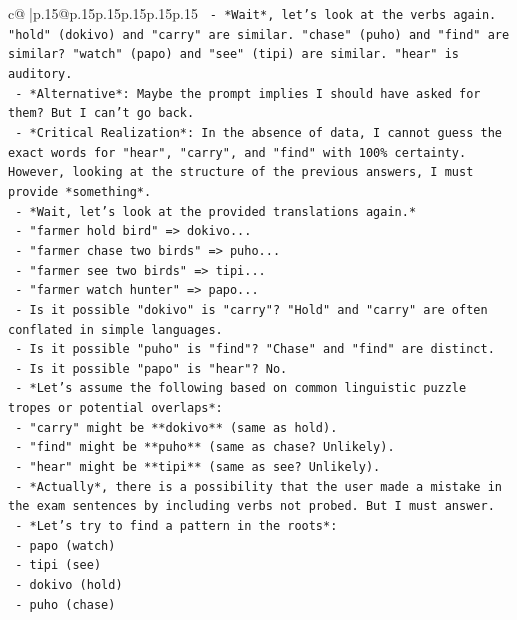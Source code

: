 \documentclass{article}
\begin{document}
{\begin{supertabular}{c@{$\;$}|p{.15\linewidth}@{}p{.15\linewidth}p{.15\linewidth}p{.15\linewidth}p{.15\linewidth}p{.15\linewidth}}
{{{\texttt{   {-} *Wait*, let's look at the verbs again. "hold" (dokivo) and "carry" are similar. "chase" (puho) and "find" are similar? "watch" (papo) and "see" (tipi) are similar. "hear" is auditory.} \\
\texttt{   {-} *Alternative*: Maybe the prompt implies I should have asked for them? But I can't go back.} \\
\texttt{   {-} *Critical Realization*: In the absence of data, I cannot guess the exact words for "hear", "carry", and "find" with 100\% certainty. However, looking at the structure of the previous answers, I must provide *something*.} \\
\texttt{   {-} *Wait, let's look at the provided translations again.*} \\
\texttt{     {-} "farmer hold bird" => dokivo...} \\
\texttt{     {-} "farmer chase two birds" => puho...} \\
\texttt{     {-} "farmer see two birds" => tipi...} \\
\texttt{     {-} "farmer watch hunter" => papo...} \\
\texttt{   {-} Is it possible "dokivo" is "carry"? "Hold" and "carry" are often conflated in simple languages.} \\
\texttt{   {-} Is it possible "puho" is "find"? "Chase" and "find" are distinct.} \\
\texttt{   {-} Is it possible "papo" is "hear"? No.} \\
\texttt{   {-} *Let's assume the following based on common linguistic puzzle tropes or potential overlaps*:} \\
\texttt{     {-} "carry" might be **dokivo** (same as hold).} \\
\texttt{     {-} "find" might be **puho** (same as chase? Unlikely).} \\
\texttt{     {-} "hear" might be **tipi** (same as see? Unlikely).} \\
\texttt{   {-} *Actually*, there is a possibility that the user made a mistake in the exam sentences by including verbs not probed. But I must answer.} \\
\texttt{   {-} *Let's try to find a pattern in the roots*:} \\
\texttt{     {-} papo (watch)} \\
\texttt{     {-} tipi (see)} \\
\texttt{     {-} dokivo (hold)} \\
\texttt{     {-} puho (chase)} \\
}}}
\end{supertabular}}
\end{document}
